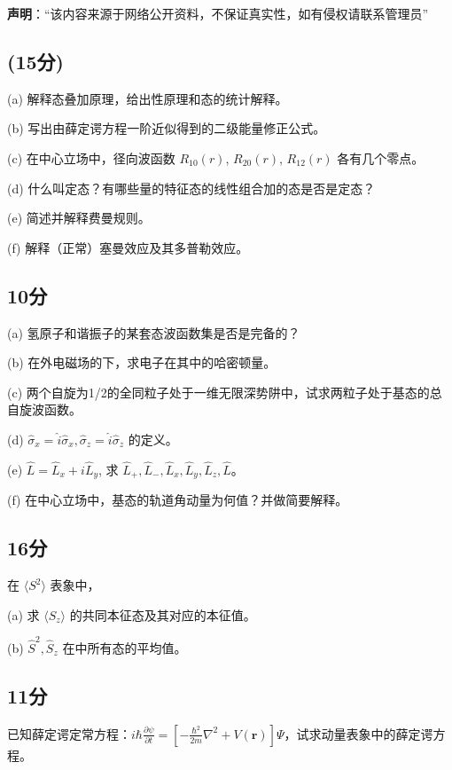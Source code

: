 
\textbf{声明}：“该内容来源于网络公开资料，不保证真实性，如有侵权请联系管理员”



\subsection{(15分)}

(a) 解释态叠加原理，给出性原理和态的统计解释。

(b) 写出由薛定谔方程一阶近似得到的二级能量修正公式。

(c) 在中心立场中，径向波函数 $R_{10}(r)$, $R_{20}(r)$, $R_{12}(r)$ 各有几个零点。

(d) 什么叫定态？有哪些量的特征态的线性组合加的态是否是定态？

(e) 简述并解释费曼规则。

(f) 解释（正常）塞曼效应及其多普勒效应。

\subsection{10分}

(a) 氢原子和谐振子的某套态波函数集是否是完备的？

(b) 在外电磁场的下，求电子在其中的哈密顿量。

(c) 两个自旋为1/2的全同粒子处于一维无限深势阱中，试求两粒子处于基态的总自旋波函数。

(d) $\hat{\sigma}_x = \hat{i} \hat{\sigma}_x, \hat{\sigma}_z = \hat{i} \hat{\sigma}_z$ 的定义。

(e) $\hat{L} = \hat{L}_x + i\hat{L}_y$, 求 ${\hat{L}_+, \hat{L}_-, \hat{L}_x, \hat{L}_y, \hat{L}_z, \hat{L} }$。

(f) 在中心立场中，基态的轨道角动量为何值？并做简要解释。


\subsection{16分}
在 $\langle S^2 \rangle$ 表象中，

(a) 求 $\langle S_z \rangle$ 的共同本征态及其对应的本征值。

(b) $\hat{S}^2, \hat{S}_z$ 在中所有态的平均值。

\subsection{11分}
已知薛定谔定常方程：$i\hbar \frac{\partial \psi}{\partial t} = \left[ -\frac{\hbar^2}{2m} \nabla^2 + V(\mathbf{r}) \right] \Psi$，试求动量表象中的薛定谔方程。


